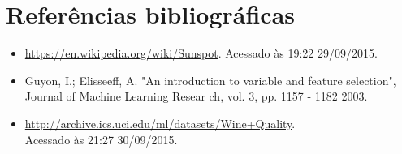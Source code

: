 \section* {Referências bibliográficas}
\begin {itemize}
  \item \url{https://en.wikipedia.org/wiki/Sunspot}. Acessado às 19:22 29/09/2015.
  \item Guyon, I.; Elisseeff, A. "An introduction to variable and feature selection", Journal of Machine Learning Resear ch, vol. 3, pp. 1157 - 1182 2003.
  \item \url{http://archive.ics.uci.edu/ml/datasets/Wine+Quality}.\\
  	 Acessado às 21:27 30/09/2015.
\end{itemize}